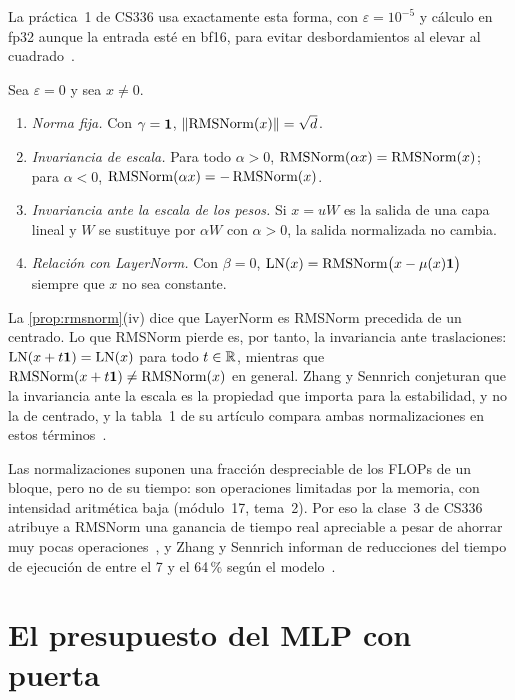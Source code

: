 La práctica~1 de CS336 usa exactamente esta forma, con $\varepsilon=10^{-5}$ y cálculo en fp32 aunque la entrada esté en bf16, para evitar desbordamientos al elevar al cuadrado~\cite[§3.4.1]{cs336a1}.

\begin{proposicion}\label{prop:rmsnorm}
Sea $\varepsilon=0$ y sea $x\ne 0$.
\begin{enumerate}
  \item \emph{Norma fija.} Con $\gamma=\mathbf{1}$, $\lVert\operatorname{RMSNorm}(x)\rVert=\sqrt d$.
  \item \emph{Invariancia de escala.} Para todo $\alpha>0$, $\operatorname{RMSNorm}(\alpha x)=\operatorname{RMSNorm}(x)$; para $\alpha<0$, $\operatorname{RMSNorm}(\alpha x)=-\operatorname{RMSNorm}(x)$.
  \item \emph{Invariancia ante la escala de los pesos.} Si $x=uW$ es la salida de una capa lineal y $W$ se sustituye por $\alpha W$ con $\alpha>0$, la salida normalizada no cambia.
  \item \emph{Relación con LayerNorm.} Con $\beta=0$, $\operatorname{LN}(x)=\operatorname{RMSNorm}\bigl(x-\mu(x)\mathbf{1}\bigr)$ siempre que $x$ no sea constante.
\end{enumerate}
\end{proposicion}

La \cref{prop:rmsnorm}(iv) dice que LayerNorm es RMSNorm precedida de un centrado. Lo que RMSNorm pierde es, por tanto, la invariancia ante traslaciones: $\operatorname{LN}(x+t\mathbf{1})=\operatorname{LN}(x)$ para todo $t\in\mathbb{R}$, mientras que $\operatorname{RMSNorm}(x+t\mathbf{1})\ne\operatorname{RMSNorm}(x)$ en general. Zhang y Sennrich conjeturan que la invariancia ante la escala es la propiedad que importa para la estabilidad, y no la de centrado, y la tabla~1 de su artículo compara ambas normalizaciones en estos términos~\cite[§4.1]{rmsnorm}.

\addtocounter{definicion}{1}%

\begin{observacion}[Coste]
Las normalizaciones suponen una fracción despreciable de los FLOPs de un bloque, pero no de su tiempo: son operaciones limitadas por la memoria, con intensidad aritmética baja (módulo~17, tema~2). Por eso la clase~3 de CS336 atribuye a RMSNorm una ganancia de tiempo real apreciable a pesar de ahorrar muy pocas operaciones~\cite{cs336}, y Zhang y Sennrich informan de reducciones del tiempo de ejecución de entre el 7 y el 64\,\% según el modelo~\cite{rmsnorm}.
\end{observacion}

\section{El presupuesto del MLP con puerta}

